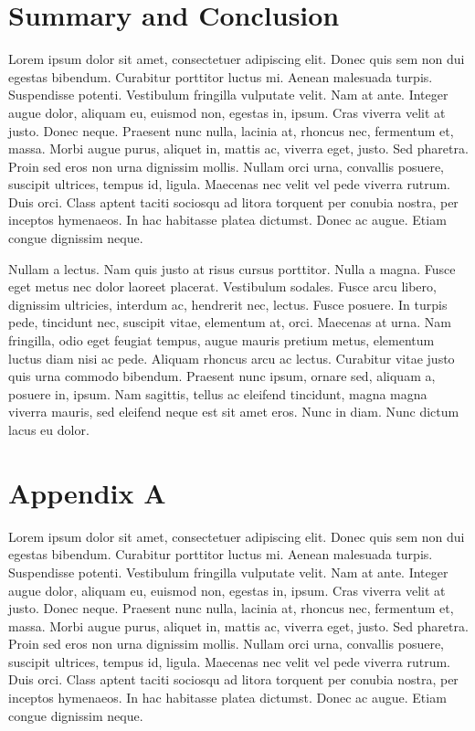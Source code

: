 \chapter{Summary and Conclusion}

Lorem ipsum dolor sit amet, consectetuer adipiscing elit. Donec quis sem non dui egestas bibendum. Curabitur porttitor luctus mi. Aenean malesuada turpis. Suspendisse potenti. Vestibulum fringilla vulputate velit. Nam at ante. Integer augue dolor, aliquam eu, euismod non, egestas in, ipsum. Cras viverra velit at justo. Donec neque. Praesent nunc nulla, lacinia at, rhoncus nec, fermentum et, massa. Morbi augue purus, aliquet in, mattis ac, viverra eget, justo. Sed pharetra. Proin sed eros non urna dignissim mollis. Nullam orci urna, convallis posuere, suscipit ultrices, tempus id, ligula. Maecenas nec velit vel pede viverra rutrum. Duis orci. Class aptent taciti sociosqu ad litora torquent per conubia nostra, per inceptos hymenaeos. In hac habitasse platea dictumst. Donec ac augue. Etiam congue dignissim neque.

Nullam a lectus. Nam quis justo at risus cursus porttitor. Nulla a magna. Fusce eget metus nec dolor laoreet placerat. Vestibulum sodales. Fusce arcu libero, dignissim ultricies, interdum ac, hendrerit nec, lectus. Fusce posuere. In turpis pede, tincidunt nec, suscipit vitae, elementum at, orci. Maecenas at urna. Nam fringilla, odio eget feugiat tempus, augue mauris pretium metus, elementum luctus diam nisi ac pede. Aliquam rhoncus arcu ac lectus. Curabitur vitae justo quis urna commodo bibendum. Praesent nunc ipsum, ornare sed, aliquam a, posuere in, ipsum. Nam sagittis, tellus ac eleifend tincidunt, magna magna viverra mauris, sed eleifend neque est sit amet eros. Nunc in diam. Nunc dictum lacus eu dolor.


\chapter{Appendix A}

Lorem ipsum dolor sit amet, consectetuer adipiscing elit. Donec quis sem non dui egestas bibendum. Curabitur porttitor luctus mi. Aenean malesuada turpis. Suspendisse potenti. Vestibulum fringilla vulputate velit. Nam at ante. Integer augue dolor, aliquam eu, euismod non, egestas in, ipsum. Cras viverra velit at justo. Donec neque. Praesent nunc nulla, lacinia at, rhoncus nec, fermentum et, massa. Morbi augue purus, aliquet in, mattis ac, viverra eget, justo. Sed pharetra. Proin sed eros non urna dignissim mollis. Nullam orci urna, convallis posuere, suscipit ultrices, tempus id, ligula. Maecenas nec velit vel pede viverra rutrum. Duis orci. Class aptent taciti sociosqu ad litora torquent per conubia nostra, per inceptos hymenaeos. In hac habitasse platea dictumst. Donec ac augue. Etiam congue dignissim neque.

